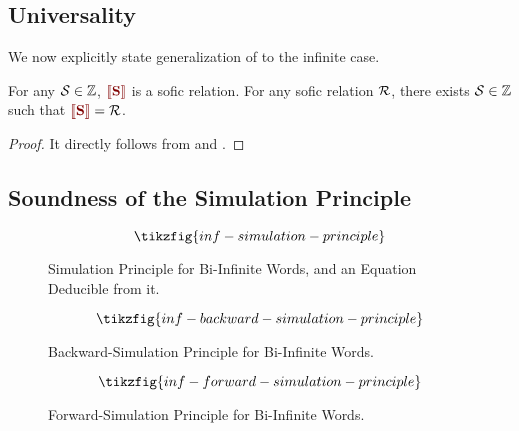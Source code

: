 \subsection{Universality}\label{app:inf-universality}

We now explicitly state generalization of  to the infinite case.
\begin{theorem}[Universality]\label{thm:universality-inf}
	For any ${\mathcal{S}} \in {\mathbb{Z}}$, $\rinterp{\rS}$ is a sofic relation. 
	For any sofic relation ${\mathcal{R}}$, there exists ${\mathcal{S}} \in {\mathbb{Z}}$ such that $\rinterp{\rS} = \R$.
\end{theorem}
\begin{proof}
It directly follows from  and .
\end{proof}

\subsection{Soundness of the Simulation Principle}\label{app:inf-simulation-principle}


\begin{figure*}[h]
	\[\tikzfig{inf-simulation-principle}\]
	\caption{Simulation Principle for Bi-Infinite Words, and an Equation Deducible from it.} %
	\label{appfig:inf-simulation-principle}
\end{figure*}

\begin{figure*}[h]
	\[\tikzfig{inf-backward-simulation-principle}\]
	\caption{Backward-Simulation Principle for Bi-Infinite Words.}
	\label{appfig:inf-backward-simulation-principle}
\end{figure*}


\begin{figure*}[h]
	\[\tikzfig{inf-forward-simulation-principle}\]
	\caption{Forward-Simulation Principle for Bi-Infinite Words.}
	\label{appfig:inf-forward-simulation-principle}
\end{figure*}

